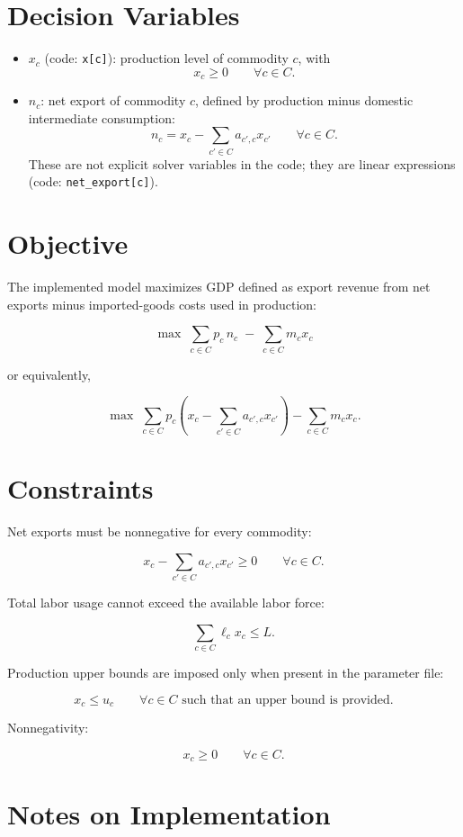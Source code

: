 \section*{Decision Variables}

\begin{itemize}
\item \(x_c\) (code: \texttt{x[c]}): production level of commodity \(c\), with
\[
x_c \ge 0 \qquad \forall c \in C.
\]
\item \(n_c\): net export of commodity \(c\), defined by production minus domestic intermediate consumption:
\[
n_c = x_c - \sum_{c' \in C} a_{c',c} x_{c'} \qquad \forall c \in C.
\]
These are not explicit solver variables in the code; they are linear expressions (code: \texttt{net\_export[c]}).
\end{itemize}

\section*{Objective}

The implemented model maximizes GDP defined as export revenue from net exports minus imported-goods costs used in production:

\[
\max \;
\sum_{c \in C} p_c\, n_c \;-\; \sum_{c \in C} m_c x_c
\]

or equivalently,

\[
\max \;
\sum_{c \in C} p_c \left(x_c - \sum_{c' \in C} a_{c',c} x_{c'}\right)
- \sum_{c \in C} m_c x_c.
\]

\section*{Constraints}

Net exports must be nonnegative for every commodity:

\[
x_c - \sum_{c' \in C} a_{c',c} x_{c'} \ge 0
\qquad \forall c \in C.
\]

Total labor usage cannot exceed the available labor force:

\[
\sum_{c \in C} \ell_c x_c \le L.
\]

Production upper bounds are imposed only when present in the parameter file:

\[
x_c \le u_c
\qquad \forall c \in C \text{ such that an upper bound is provided.}
\]

Nonnegativity:

\[
x_c \ge 0 \qquad \forall c \in C.
\]

\section*{Notes on Implementation}

